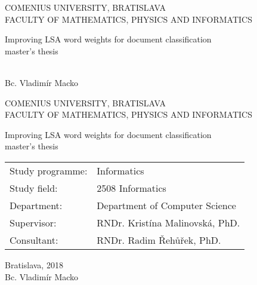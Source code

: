 \documentclass[12pt, oneside]{book}
\theoremstyle{definition}
\def\mfrok{2018}
\def\mfnazov{Improving LSA word weights for document classification}
\def\mftyp{master's thesis}
\def\mfautor{Bc. Vladimír Macko}
\def\mfskolitel{RNDr. Kristína Malinovská, PhD.}
\def\mfkonzultant{RNDr. Radim Řehůřek, PhD.}
\def\mfmiesto{Bratislava, \mfrok}
\def\mfodbor{ 2508 Informatics }
\def\program{ Informatics }
\def\mfpracovisko{ Department of Computer Science }
\begin{document}
     

\thispagestyle{empty}

\begin{center}
\sc\large
COMENIUS UNIVERSITY, BRATISLAVA\\
FACULTY OF MATHEMATICS, PHYSICS AND INFORMATICS

\vfill

{\LARGE\mfnazov}\\
\mftyp
\end{center}

\vfill

{\sc\large 
\noindent \mfrok\\
\mfautor
}

\eject %


\thispagestyle{empty}
\noindent

\begin{center}
\sc  
\large
COMENIUS UNIVERSITY, BRATISLAVA\\
FACULTY OF MATHEMATICS, PHYSICS AND INFORMATICS

\vfill

{\LARGE\mfnazov}\\
\mftyp
\end{center}

\vfill

\noindent
\begin{tabular}{ll}
Study programme: & \program \\
Study field: & \mfodbor \\
Department: & \mfpracovisko \\
Supervisor: & \mfskolitel \\
Consultant: & \mfkonzultant \\
\end{tabular}

\vfill


\noindent \mfmiesto\\
\mfautor

\eject %





\newpage 
\thispagestyle{empty}

\end{document}
